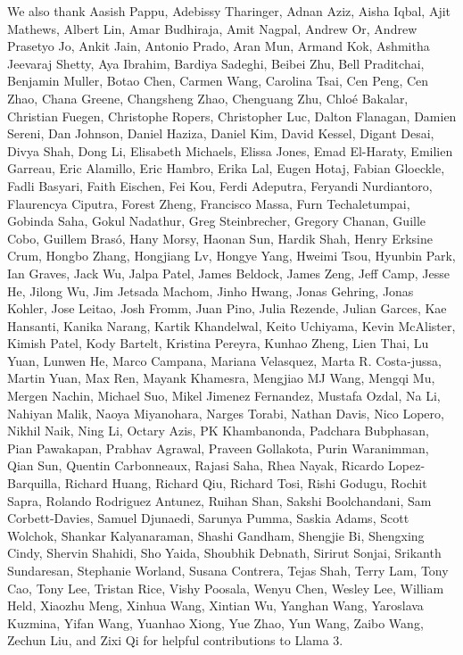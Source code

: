 \documentclass[dvipsnames]{fairmeta}
\begin{document}
We also thank Aasish Pappu, Adebissy Tharinger, Adnan Aziz, Aisha Iqbal, Ajit Mathews, Albert Lin, Amar Budhiraja, Amit Nagpal, Andrew Or, Andrew Prasetyo Jo, Ankit Jain, Antonio Prado, Aran Mun, Armand Kok, Ashmitha Jeevaraj Shetty, Aya Ibrahim, Bardiya Sadeghi, Beibei Zhu, Bell Praditchai, Benjamin Muller, Botao Chen, Carmen Wang, Carolina Tsai, Cen Peng, Cen Zhao, Chana Greene, Changsheng Zhao, Chenguang Zhu, Chloé Bakalar, Christian Fuegen, Christophe Ropers, Christopher Luc, Dalton Flanagan, Damien Sereni, Dan Johnson, Daniel Haziza, Daniel Kim, David Kessel, Digant Desai, Divya Shah, Dong Li, Elisabeth Michaels, Elissa Jones, Emad El-Haraty, Emilien Garreau, Eric Alamillo, Eric Hambro, Erika Lal, Eugen Hotaj, Fabian Gloeckle, Fadli Basyari, Faith Eischen, Fei Kou, Ferdi Adeputra, Feryandi Nurdiantoro, Flaurencya Ciputra, Forest Zheng, Francisco Massa, Furn Techaletumpai, Gobinda Saha, Gokul Nadathur, Greg Steinbrecher, Gregory Chanan, Guille Cobo, Guillem Brasó, Hany Morsy, Haonan Sun, Hardik Shah, Henry Erksine Crum, Hongbo Zhang, Hongjiang Lv, Hongye Yang, Hweimi Tsou, Hyunbin Park, Ian Graves, Jack Wu, Jalpa Patel, James Beldock, James Zeng, Jeff Camp, Jesse He, Jilong Wu, Jim Jetsada Machom, Jinho Hwang, Jonas Gehring, Jonas Kohler, Jose Leitao, Josh Fromm, Juan Pino, Julia Rezende, Julian Garces, Kae Hansanti, Kanika Narang, Kartik Khandelwal, Keito Uchiyama, Kevin McAlister, Kimish Patel, Kody Bartelt, Kristina Pereyra, Kunhao Zheng, Lien Thai, Lu Yuan, Lunwen He, Marco Campana, Mariana Velasquez, Marta R. Costa-jussa, Martin Yuan, Max Ren, Mayank Khamesra, Mengjiao MJ Wang, Mengqi Mu, Mergen Nachin, Michael Suo, Mikel Jimenez Fernandez, Mustafa Ozdal, Na Li, Nahiyan Malik, Naoya Miyanohara, Narges Torabi, Nathan Davis, Nico Lopero, Nikhil Naik, Ning Li, Octary Azis, PK Khambanonda, Padchara Bubphasan, Pian Pawakapan, Prabhav Agrawal, Praveen Gollakota, Purin Waranimman, Qian Sun, Quentin Carbonneaux, Rajasi Saha, Rhea Nayak, Ricardo Lopez-Barquilla, Richard Huang, Richard Qiu, Richard Tosi, Rishi Godugu, Rochit Sapra, Rolando Rodriguez Antunez, Ruihan Shan, Sakshi Boolchandani, Sam Corbett-Davies, Samuel Djunaedi, Sarunya Pumma, Saskia Adams, Scott Wolchok, Shankar Kalyanaraman, Shashi Gandham, Shengjie Bi, Shengxing Cindy, Shervin Shahidi, Sho Yaida, Shoubhik Debnath, Sirirut Sonjai, Srikanth Sundaresan, Stephanie Worland, Susana Contrera, Tejas Shah, Terry Lam, Tony Cao, Tony Lee, Tristan Rice, Vishy Poosala, Wenyu Chen, Wesley Lee, William Held, Xiaozhu Meng, Xinhua Wang, Xintian Wu, Yanghan Wang, Yaroslava Kuzmina, Yifan Wang, Yuanhao Xiong, Yue Zhao, Yun Wang, Zaibo Wang, Zechun Liu, and Zixi Qi for helpful contributions to Llama 3.

\clearpage
\newpage


\end{document}
